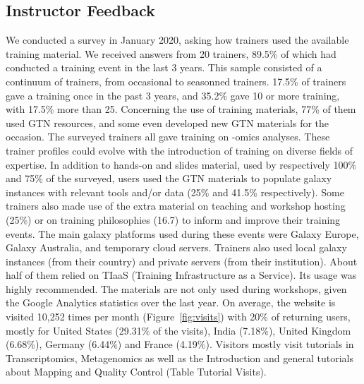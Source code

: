 \documentclass[10pt,letterpaper]{article}
\begin{document}
\subsection*{Instructor Feedback}

We conducted a survey in January 2020, asking how trainers used the available training material. We received answers from 20 trainers, 89.5\% of which had conducted a training event in the last 3 years.
This sample consisted of a continuum of trainers, from occasional to seasonned trainers. 17.5\% of trainers gave a training once in the past 3 years, and 35.2\% gave 10 or more training, with 17.5\% more than 25.
Concerning the use of training materials, 77\% of them used GTN resources, and some even developed new GTN materials for the occasion. The surveyed trainers all gave training on -omics analyses.
These trainer profiles could evolve with the introduction of training on diverse fields of expertise. In addition to hands-on and slides material, used by respectively 100\% and 75\% of the surveyed, users used the GTN materials to populate galaxy instances with relevant tools and/or data (25\% and 41.5\% respectively).
Some trainers also made use of the extra material on teaching and workshop hosting (25\%) or on training philosophies (16.7) to inform and improve their training events.
The main galaxy platforms used during these events were Galaxy Europe, Galaxy  Australia, and temporary cloud servers. Trainers also used local galaxy instances (from their country) and  private servers (from their institution).
About half of them relied on TIaaS (Training Infrastructure as a Service). Its usage was highly recommended.
The materials are not only used during workshops, given the Google Analytics statistics over the last year.
On average, the website is visited 10,252 times per month (Figure~\ref{fig:visits}) with 20\% of returning users, mostly for United States (29.31\% of the visits), India (7.18\%), United Kingdom (6.68\%), Germany (6.44\%) and France (4.19\%). Visitors mostly visit tutorials in Transcriptomics, Metagenomics as well as the Introduction and general tutorials about Mapping and Quality Control (Table Tutorial Visits).
\end{document}
